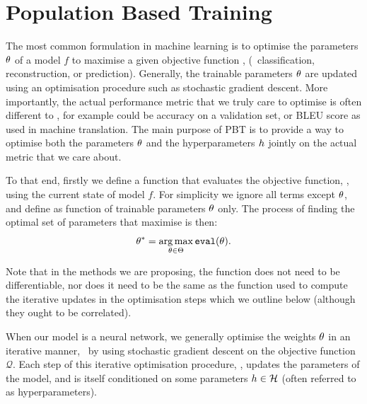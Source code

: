 \section{Population Based Training}\label{sec:pbt}

The most common formulation in machine learning is to optimise the parameters $\theta$ of a model $f$ to maximise a given objective function \diffobj, (\eg~classification, reconstruction, or prediction). Generally, the trainable parameters $\theta$ are updated using an optimisation procedure such as stochastic gradient descent.
%
More importantly, the actual performance metric \mainobj{} that we truly care to optimise is often different to \diffobj{}, for example \mainobj{} could be accuracy on a validation set, or BLEU score as used in machine translation. The main purpose of PBT is to provide a way to optimise both the parameters $\theta$ and the hyperparameters $h$ jointly on the actual metric \mainobj{} that we care about.

To that end, firstly we define a function \pbteval that evaluates the objective function, \mainobj{}, using the current state of model $f$. For simplicity we ignore all terms except $\theta$, and define \pbteval as function of trainable parameters $\theta$ only. The process of finding the optimal set of parameters that maximise \mainobj{} is then:
\begin{equation}
\theta^* = \operatorname*{arg\,max}_{\theta \in \Theta} \mathtt{eval}(\theta).
\label{eqn:optimise}
\end{equation}

Note that in the methods we are proposing, the \pbteval function does not need to be differentiable, nor does it need to be the same as the function used to compute the iterative updates in the optimisation steps which we outline below (although they ought to be correlated).

When our model is a neural network, we generally optimise the weights $\theta$ in an iterative manner, \eg~by using stochastic gradient descent on the objective function $\mathcal{Q}$. Each step of this iterative optimisation procedure, \pbtstep, updates the parameters of the model, and is itself conditioned on some parameters $h \in \mathcal{H}$ (often referred to as hyperparameters). 

